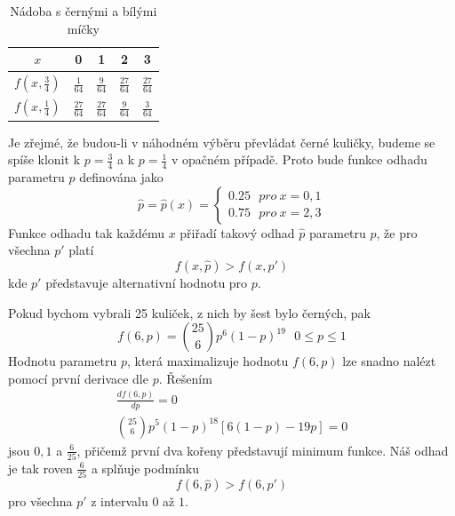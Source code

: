 \begin{table}
\begin{center}
\begin{tabular}{| c | c | c | c | c |}
\hline
$x$ & 0 & 1 & 2 & 3\\
\hline
$f(x, \frac{3}{4})$ & $\frac{1}{64}$  & $\frac{9}{64}$ & $\frac{27}{64}$ & $\frac{27}{64}$\\
\hline
$f(x, \frac{1}{4})$ & $\frac{27}{64}$  & $\frac{27}{64}$ & $\frac{9}{64}$ & $\frac{3}{64}$\\
\hline
\end{tabular}
\caption{Nádoba s černými a bílými míčky}
\label{max-likelihood-example}
\end{center}
\end{table}
Je zřejmé, že budou-li v náhodném výběru převládat černé kuličky, budeme se spíše klonit k $p = \frac{3}{4}$ a k $p = \frac{1}{4}$ v opačném případě. Proto bude funkce odhadu parametru $p$ definována jako
\begin{equation*}
\hat{p} = \hat{p}(x) = 
\begin{cases}
0.25 ~~~ \textit{pro} ~ x = 0, 1\\
0.75 ~~~ \textit{pro} ~ x = 2, 3
\end{cases}
\end{equation*}
Funkce odhadu tak každému $x$ přiřadí takový odhad $\hat{p}$ parametru $p$, že pro všechna $p'$ platí
\begin{equation*}
f(x, \hat{p}) > f(x, p')
\end{equation*}
kde $p'$ představuje alternativní hodnotu pro $p$.

Pokud bychom vybrali 25 kuliček, z nich by šest bylo černých, pak
\begin{equation*}
f(6, p) = \binom{25}{6}p^6(1 - p)^{19} ~~~ 0 \le p \le 1
\end{equation*}
Hodnotu parametru $p$, která maximalizuje hodnotu $f(6,p)$ lze snadno nalézt pomocí první derivace dle $p$. Řešením
\begin{gather*}
\frac{d f(6, p)}{d p} = 0\\
\binom{25}{6}p^5(1 - p)^{18}[6(1 - p) - 19p] = 0
\end{gather*}
jsou $0, 1$ a $\frac{6}{25}$, přičemž první dva kořeny představují minimum funkce. Náš odhad je tak roven $\frac{6}{25}$ a splňuje podmínku
\begin{equation*}
f(6, \hat{p}) > f(6, p')
\end{equation*}
pro všechna $p'$ z intervalu $0$ až $1$.

